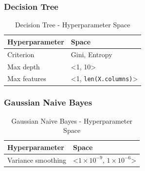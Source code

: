 \subsubsection{Decision Tree}
\begin{table}[H]
    \small
    \setlength{\tabcolsep}{8pt}
    \renewcommand{\arraystretch}{1.3}
    \centering
        \caption[Decision Tree - Hyperparameter Space]{Decision Tree - Hyperparameter Space}\label{tab:dtspace}
        \begin{tabular}{ll}
    \toprule
    \textbf{Hyperparameter} & \textbf{Space}\\
    \midrule
    \hline
    Criterion & Gini, Entropy \\
    Max depth & <1, 10> \\
    Max features & <1, \verb|len(X.columns)|>  \\
    \hline
    \bottomrule
    \end{tabular}
    \vspace{0.7em}

    \vspace{-1em}
\end{table}

\subsubsection{Gaussian Naive Bayes}

\begin{table}[H]
    \small
    \setlength{\tabcolsep}{8pt}
    \renewcommand{\arraystretch}{1.3}
    \centering
        \caption[Gaussian Naive Bayes - Hyperparameter Space]{Gaussian Naive Bayes  - Hyperparameter Space}\label{tab:gnbspace}
        \begin{tabular}{ll}
    \toprule
    \textbf{Hyperparameter} & \textbf{Space}\\
    \midrule
    \hline
    Variance smoothing & <$1\times 10^{-9}$, $1\times 10^{-6}$> \\
    \hline
    \bottomrule
    \end{tabular}
    \vspace{0.7em}

    \vspace{-1em}
\end{table}



